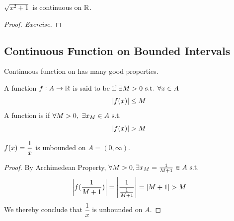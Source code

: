 \documentclass[a4paper,12pt]{article}
\begin{document}
\begin{example}
    \(\sqrt{x^2+1}\) is continuous on \(\mathbb{R}\).
    \begin{proof}[Proof. Exercise]        
    \end{proof}
\end{example}

\newpage

\subsection{Continuous Function on Bounded Intervals}
Continuous function on  has many good properties.\\

\begin{definition}
    A function \(f:A\rightarrow\mathbb{R}\) is said to be  if \(\exists M>0\text{ s.t. }\forall x\in A\)
    \[\left\lvert f(x)\right\rvert\le M\] 
    A function is  if \(\forall M>0,\ \exists x_M\in A\text{ s.t. }\)
    \[\left\lvert f(x)\right\rvert>M\]
\end{definition}

\begin{example}
    \(\displaystyle f(x)=\frac{1}{x }\) is unbounded on \(A=(0,\infty)\).
    \begin{proof}
        By Archimedean Property, \(\forall M>0,\exists x_M=\frac{1}{M+1}\in A\text{ s.t. }\)
        \[\left\lvert f(\frac{1}{M+1})\right\rvert=\left\lvert \frac{1}{\frac{1}{M+1}}\right\rvert=\left\lvert M+1\right\rvert>M\]
        We thereby conclude that \(\dfrac{1}{x}\) is unbounded on \(A\).
    \end{proof}
\end{example}
\end{document}

